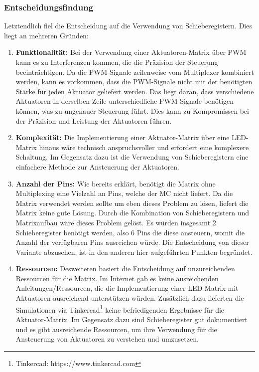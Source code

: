 \subsubsection{Entscheidungsfindung}
Letztendlich fiel die Entscheidung auf die Verwendung von Schieberegistern. Dies liegt an mehreren Gründen:
\begin{enumerate}
	\item \textbf{Funktionalität:} Bei der Verwendung einer Aktuatoren-Matrix über \ac{PWM}
	kann es zu Interferenzen kommen, die die Präzision der Steuerung beeinträchtigen. Da die \ac{PWM}-Signale zeilenweise
	vom Multiplexer kombiniert werden, kann es vorkommen, dass die \ac{PWM}-Signale nicht mit der benötigten Stärke für jeden Aktuator geliefert
	werden. Das liegt daran, dass verschiedene Aktuatoren in derselben Zeile unterschiedliche \ac{PWM}-Signale benötigen können,
	was zu ungenauer Steuerung führt. Dies kann zu Kompromissen bei der Präzision und Leistung der Aktuatoren führen.
	\item \textbf{Komplexität:} Die Implementierung einer Aktuator-Matrix über eine
	LED-Matrix hinaus wäre technisch anspruchsvoller und erfordert eine komplexere Schaltung. Im Gegensatz dazu ist die
	Verwendung von Schieberegistern eine einfachere Methode zur Ansteuerung der Aktuatoren.
	\item \textbf{Anzahl der Pins:} Wie bereits erklärt, benötigt die Matrix ohne Multiplexing eine Vielzahl an Pins, welche der \ac{MC}
	nicht liefert. Da die Matrix verwendet werden sollte um eben dieses Problem zu lösen, liefert die Matrix keine gute Lösung.
	Durch die Kombination von Schieberegistern und Matrixaufbau wäre dieses Problem gelöst.
	Es würden insgesamt 2 Schieberegister benötigt werden, also 6 Pins die diese ansteuern, womit die Anzahl der verfügbaren Pins ausreichen würde.
	Die Entscheidung von dieser Variante abzusehen, ist in den anderen hier aufgeführten Punkten begründet.
	\item \textbf{Ressourcen:} Desweiteren basiert die Entscheidung auf unzureichenden Ressourcen für die Matrix. Im Internet gab es
	keine ausreichenden Anleitungen/Ressourcen, die die Implementierung einer LED-Matrix mit Aktuatoren ausreichend
	unterstützen würden. Zusätzlich dazu lieferten die Simulationen via Tinkercad\footnote{Tinkercad: https://www.tinkercad.com} keine befriedigenden Ergebnisse
	für die Aktuator-Matrix.
	Im Gegensatz dazu sind Schieberegister gut dokumentiert und es gibt ausreichende Ressourcen, um ihre
	Verwendung für die Ansteuerung von Aktuatoren zu verstehen und umzusetzen.
\end{enumerate}

